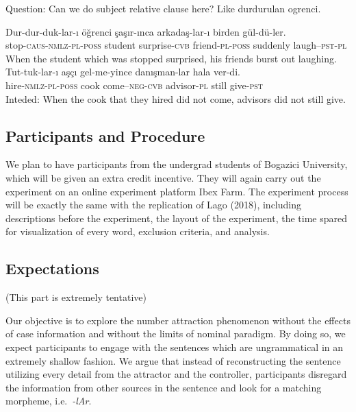 \documentclass[11pt,a4paper]{article}
\begin{document}
Question: Can we do subject relative clause here? Like durdurulan
ogrenci.

\begin{exe}
\ex
\begin{xlist}
\ex \label{fillerreg1}
\gll Dur-dur-duk-lar-{\i} \"{o}\u{g}renci \c{s}a\c{s}{\i}r-{\i}nca arkada\c{s}-lar-{\i} birden g\"{u}l-d\"{u}-ler.\\
stop-\textsc{caus}-\textsc{nmlz}-\textsc{pl}-\textsc{poss} student surprise-\textsc{cvb} friend-\textsc{pl}-\textsc{poss} suddenly laugh--\textsc{pst}-\textsc{pl}\\
\glt When the student which was stopped surprised, his friends burst out laughing.
\ex \label{fillerreg2}
\gll *Tut-tuk-lar-{\i} a\c{s}\c{c}{\i} gel-me-yince dan{\i}\c{s}man-lar hala ver-di.\\
hire-\textsc{nmlz}-\textsc{pl}-\textsc{poss} cook come--\textsc{neg}-\textsc{cvb} advisor-\textsc{pl} still give-\textsc{pst}\\
\glt Inteded: When the cook that they hired did not come, advisors did not still give. 
\end{xlist}
\end{exe}

\hypertarget{participants-and-procedure-1}{%
\subsection{Participants and
Procedure}\label{participants-and-procedure-1}}

We plan to have participants from the undergrad students of Bogazici
University, which will be given an extra credit incentive. They will
again carry out the experiment on an online experiment platform Ibex
Farm. The experiment process will be exactly the same with the
replication of Lago (2018), including descriptions before the
experiment, the layout of the experiment, the time spared for
visualization of every word, exclusion criteria, and analysis.

\hypertarget{expectations}{%
\subsection{Expectations}\label{expectations}}

(This part is extremely tentative)

Our objective is to explore the number attraction phenomenon without the
effects of case information and without the limits of nominal paradigm.
By doing so, we expect participants to engage with the sentences which
are ungrammatical in an extremely shallow fashion. We argue that instead
of reconstructing the sentence utilizing every detail from the attractor
and the controller, participants disregard the information from other
sources in the sentence and look for a matching morpheme,
i.e.~\emph{-lAr}.
\end{document}
